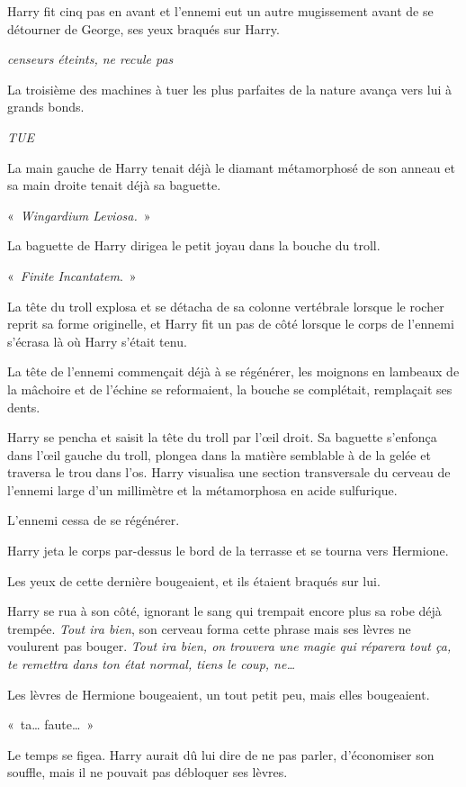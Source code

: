 Harry fit cinq pas en avant et l'ennemi eut un autre mugissement avant de se détourner de George, ses yeux braqués sur Harry.

\emph{censeurs éteints, ne recule pas}

La troisième des machines à tuer les plus parfaites de la nature avança vers lui à grands bonds.

\emph{TUE}

La main gauche de Harry tenait déjà le diamant métamorphosé de son anneau et sa main droite tenait déjà sa baguette.

«~\emph{Wingardium Leviosa.}~»

La baguette de Harry dirigea le petit joyau dans la bouche du troll.

«~\emph{Finite Incantatem}.~»

La tête du troll explosa et se détacha de sa colonne vertébrale lorsque le rocher reprit sa forme originelle, et Harry fit un pas de côté lorsque le corps de l'ennemi s'écrasa là où Harry s'était tenu.

La tête de l'ennemi commençait déjà à se régénérer, les moignons en lambeaux de la mâchoire et de l'échine se reformaient, la bouche se complétait, remplaçait ses dents.

Harry se pencha et saisit la tête du troll par l'œil droit. Sa baguette s'enfonça dans l'œil gauche du troll, plongea dans la matière semblable à de la gelée et traversa le trou dans l'os. Harry visualisa une section transversale du cerveau de l'ennemi large d'un millimètre et la métamorphosa en acide sulfurique.

L'ennemi cessa de se régénérer.

Harry jeta le corps par-dessus le bord de la terrasse et se tourna vers Hermione.

Les yeux de cette dernière bougeaient, et ils étaient braqués sur lui.

Harry se rua à son côté, ignorant le sang qui trempait encore plus sa robe déjà trempée. \emph{Tout ira bien}, son cerveau forma cette phrase mais ses lèvres ne voulurent pas bouger. \emph{Tout ira bien, on trouvera une magie qui réparera tout ça, te remettra dans ton état normal, tiens le coup, ne…}

Les lèvres de Hermione bougeaient, un tout petit peu, mais elles bougeaient.

«~ta… faute…~»

Le temps se figea. Harry aurait dû lui dire de ne pas parler, d'économiser son souffle, mais il ne pouvait pas débloquer ses lèvres.

